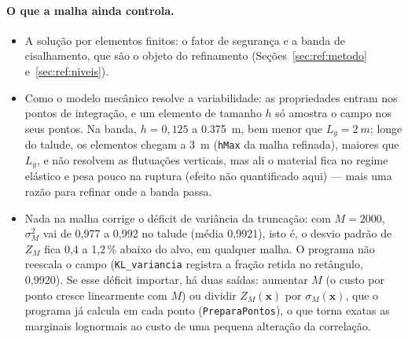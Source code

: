 \paragraph{O que a malha ainda controla.}
\begin{itemize}
  \item A solução por elementos finitos: o fator de segurança e a banda de cisalhamento, que são o objeto do refinamento
    (Seções~\ref{sec:ref:metodo} e~\ref{sec:ref:niveis}).
  \item Como o modelo mecânico resolve a variabilidade: as propriedades entram nos pontos de integração, e um elemento
    de tamanho $h$ só amostra o campo nos seus pontos. Na banda, $h = 0{,}125$ a \SI{0.375}{m}, bem menor que
    $L_y = \SI{2}{m}$; longe do talude, os elementos chegam a \SI{3}{m} (\texttt{hMax} da malha refinada), maiores que
    $L_y$, e não resolvem as flutuações verticais, mas ali o material fica no regime elástico e pesa pouco na ruptura
    (efeito não quantificado aqui) --- mais uma razão para refinar onde a banda passa.
  \item Nada na malha corrige o déficit de variância da truncação: com $M = 2000$, $\sigma_M^2$ vai de 0,977 a 0,992 no
    talude (média 0,9921), isto é, o desvio padrão de $Z_M$ fica 0,4 a 1,2\,\% abaixo do alvo, em qualquer malha. O
    programa não reescala o campo (\texttt{KL\_variancia} registra a fração retida no retângulo, 0,9920). Se esse déficit
    importar, há duas saídas: aumentar $M$ (o custo por ponto cresce linearmente com $M$) ou dividir $Z_M(\mathbf{x})$
    por $\sigma_M(\mathbf{x})$, que o programa já calcula em cada ponto (\texttt{PreparaPontos}), o que torna exatas as
    marginais lognormais ao custo de uma pequena alteração da correlação.
\end{itemize}
